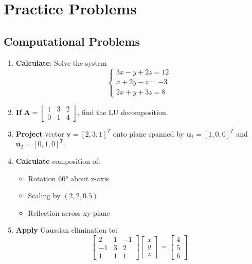 \documentclass[12pt,a4paper]{article}
\theoremstyle{definition}
\begin{document}
\newpage

\section{Practice Problems}

\subsection{Computational Problems}

\begin{enumerate}
\item \textbf{Calculate}: Solve the system
\[
\begin{cases}
3x - y + 2z = 12 \\
x + 2y - z = -3 \\
2x + y + 3z = 8
\end{cases}
\]

\item \textbf{If} $\mathbf{A} = \begin{bmatrix} 1 & 3 & 2 \\ 0 & 1 & 4 \end{bmatrix}$, find the LU decomposition.

\item \textbf{Project} vector $\mathbf{v} = [2, 3, 1]^T$ onto plane spanned by $\mathbf{u}_1 = [1, 0, 0]^T$ and $\mathbf{u}_2 = [0, 1, 0]^T$.

\item \textbf{Calculate} composition of:
\begin{itemize}
\item Rotation 60° about z-axis
\item Scaling by $(2, 2, 0.5)$  
\item Reflection across xy-plane
\end{itemize}

\item \textbf{Apply} Gaussian elimination to:
\[
\begin{bmatrix}
2 & 1 & -1 \\
-1 & 3 & 2 \\
1 & 1 & 1
\end{bmatrix}
\begin{bmatrix}
x \\ y \\ z
\end{bmatrix}
= \begin{bmatrix}
4 \\ 5 \\ 6
\end{bmatrix}
\]
\end{enumerate}
\end{document}
